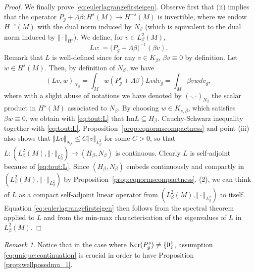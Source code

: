 \documentclass[10pt]{amsart}
\numberwithin{equation}{section}
\def\ker{{\mathop{\rm Ker}}}
\newcommand{\vp}{\varphi}
\theoremstyle{plain}
\theoremstyle{remark}
\newtheorem{rem}{Remark}[section]
\begin{document}
\begin{proof}
We finally prove \eqref{eq:eulerlagrangefirsteigen}. Observe first that (ii) implies that the operator $P_g + \Lambda \beta: H^s(M) \to H^{-s}(M)$ is invertible, where we endow $H^{-s}(M)$ with the dual norm induced by $N_\beta$ (which is equivalent to the dual norm induced by $\Vert \cdot \Vert_{H^s}$). We define, for $v \in L^2_\beta(M)$, 
$$Lv : = \big( P_g + \Lambda \beta \big)^{-1}( \beta v).$$
Remark that $L$ is well-defined since for any $v \in K_{\beta}$, $\beta v \equiv 0$ by definition. Let $w \in H^s(M)$. 
Then, by definition of $N_\beta$, we have 
\begin{equation} \label{eq:tout:L}
 (Lv, w)_{N_\beta} = \int_M w (P_g^s + \Lambda \beta)Lv dv_g = \int_M \beta vw dv_g,
 \end{equation}
where with a slight abuse of notations we have denoted by $(\cdot, \cdot)_{N_\beta}$ the scalar product in $H^s(M)$ associated to $N_\beta$. By choosing $w \in K_{s,\beta}$, which satisfies $\beta w \equiv 0$, we obtain with \eqref{eq:tout:L} that $\text{Im} L \subseteq H_\beta$. Cauchy-Schwarz inequality together with \eqref{eq:tout:L}, Proposition~\ref{prop:eqnormscompactness} and point (iii) also shows that $\Vert Lv \Vert_{N_\beta} \le C \Vert v \Vert_{L^2_\beta}$ for some $C>0$, so that $L: (L^2_\beta(M), \Vert \cdot \Vert_{L^2_\beta}) \to (H_\beta, N_\beta)$ is continuous. Clearly $L$ is self-adjoint because of \eqref{eq:tout:L}. Since $(H_\beta, N_\beta)$ embeds continuously and compactly  in $(L^2_\beta(M),  \Vert \cdot \Vert_{L^2_\beta})$ by Proposition~\ref{prop:eqnormscompactness}, (2), we can think of $L$ as a compact self-adjoint linear operator from $(L^2_\beta(M), \Vert \cdot \Vert_{L^2_\beta})$ to itself. Equation \eqref{eq:eulerlagrangefirsteigen}  then follows from the spectral theorem applied to $L$ and from the min-max characterisation of the eigenvalues of $L$ in $L^2_\beta(M)$. 
\end{proof}

\begin{rem}
Notice that in the case where $\ker(P_g^s) \neq \{0\}$, assumption \eqref{eq:unique:continuation} is crucial in order to have Proposition \ref{prop:wellposedmu_1}.
\end{rem}
\end{document}
